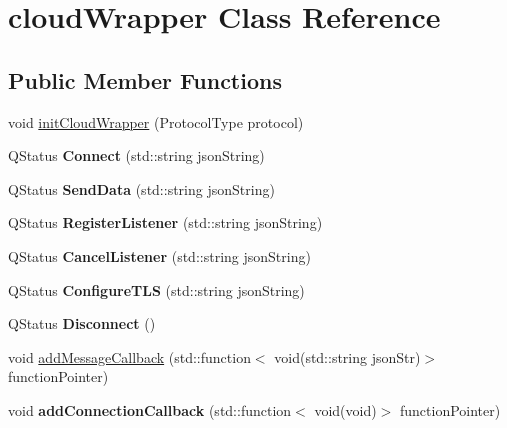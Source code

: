 \hypertarget{classcloudWrapper}{}\section{cloud\+Wrapper Class Reference}
\label{classcloudWrapper}
\subsection*{Public Member Functions}
\begin{DoxyCompactItemize}
\item 
void \hyperlink{classcloudWrapper_a4f69ede49f1eeacf28620683c1a8e88c}{init\+Cloud\+Wrapper} (Protocol\+Type protocol)
\item 
Q\+Status {\bfseries Connect} (std\+::string json\+String)\hypertarget{classcloudWrapper_af973f5cc72e6567c24ea8c7da509fe0b}{}\label{classcloudWrapper_af973f5cc72e6567c24ea8c7da509fe0b}

\item 
Q\+Status {\bfseries Send\+Data} (std\+::string json\+String)\hypertarget{classcloudWrapper_abc5a65a04f3ce240d0a2ae88ca8871ce}{}\label{classcloudWrapper_abc5a65a04f3ce240d0a2ae88ca8871ce}

\item 
Q\+Status {\bfseries Register\+Listener} (std\+::string json\+String)\hypertarget{classcloudWrapper_a25357b85f8bdb2f29b42b92a9c5f1c0e}{}\label{classcloudWrapper_a25357b85f8bdb2f29b42b92a9c5f1c0e}

\item 
Q\+Status {\bfseries Cancel\+Listener} (std\+::string json\+String)\hypertarget{classcloudWrapper_a5cf0defacb6e67a6a1383eb3198e4bfb}{}\label{classcloudWrapper_a5cf0defacb6e67a6a1383eb3198e4bfb}

\item 
Q\+Status {\bfseries Configure\+T\+LS} (std\+::string json\+String)\hypertarget{classcloudWrapper_a02473231b739888efceb9dcd1be8cf9b}{}\label{classcloudWrapper_a02473231b739888efceb9dcd1be8cf9b}

\item 
Q\+Status {\bfseries Disconnect} ()\hypertarget{classcloudWrapper_aa0d645e47206da9fbbd994363dea3aec}{}\label{classcloudWrapper_aa0d645e47206da9fbbd994363dea3aec}

\item 
void \hyperlink{classcloudWrapper_a52d04484e0ac23ce6d28a476fc38503c}{add\+Message\+Callback} (std\+::function$<$ void(std\+::string json\+Str)$>$ function\+Pointer)
\item 
void {\bfseries add\+Connection\+Callback} (std\+::function$<$ void(void)$>$ function\+Pointer)\hypertarget{classcloudWrapper_aee7b73f7b8daf11ef067b2f2a0e00eef}{}\label{classcloudWrapper_aee7b73f7b8daf11ef067b2f2a0e00eef}


\end{DoxyCompactItemize}
